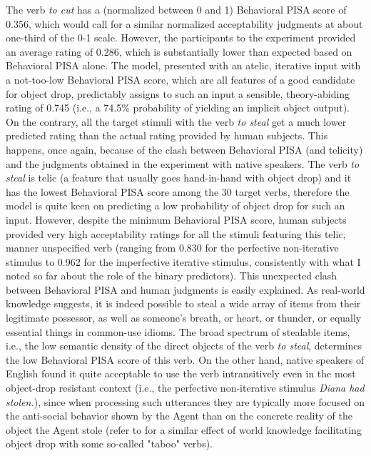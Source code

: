 The verb \textit{to cut} has a (normalized between 0 and 1) Behavioral PISA score of 0.356, which would call for a similar normalized acceptability judgments at about one-third of the 0-1 scale. However, the participants to the experiment provided an average rating of 0.286, which is substantially lower than expected based on Behavioral PISA alone. The model, presented with an atelic, iterative input with a not-too-low Behavioral PISA score, which are all features of a good candidate for object drop, predictably assigns to such an input a sensible, theory-abiding rating of 0.745 (i.e., a 74.5\% probability of yielding an implicit object output).\\ 
On the contrary, all the target stimuli with the verb \textit{to steal} get a much lower predicted rating than the actual rating provided by human subjects. This happens, once again, because of the clash between Behavioral PISA (and telicity) and the judgments obtained in the experiment with native speakers. The verb \textit{to steal} is telic (a feature that usually goes hand-in-hand with object drop) and it has the lowest Behavioral PISA score among the 30 target verbs, therefore the model is quite keen on predicting a low probability of object drop for such an input. However, despite the minimum Behavioral PISA score, human subjects provided very high acceptability ratings for all the stimuli featuring this telic, manner unspecified verb (ranging from 0.830 for the perfective non-iterative stimulus to 0.962 for the imperfective iterative stimulus, consistently with what I noted so far about the role of the binary predictors). This unexpected clash between Behavioral PISA and human judgments is easily explained. As real-world knowledge suggests, it is indeed possible to steal a wide array of items from their legitimate possessor, as well as someone's breath, or heart, or thunder, or equally essential things in common-use idioms. The broad spectrum of stealable items, i.e., the low semantic density of the direct objects of the verb \textit{to steal}, determines the low Behavioral PISA score of this verb. On the other hand, native speakers of English found it quite acceptable to use the verb intransitively even in the most object-drop resistant context (i.e., the perfective non-iterative stimulus \textit{Diana had stolen.}), since when processing such utterances they are typically more focused on the anti-social behavior shown by the Agent than on the concrete reality of the object the Agent stole (refer to \textcite[21-28]{Goldberg2005} for a similar effect of world knowledge facilitating object drop with some so-called "taboo" verbs). 


